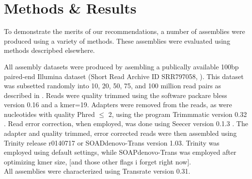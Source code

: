 \section*{Methods & Results}

To demonstrate the merits of our recommendations, a number of assemblies were produced using a variety of methods. These assemblies were evaluated using methods descripbed elsewhere. 

All assembly datasets were produced by asembling a publically available 100bp paired-end Illumina dataset (Short Read Archive ID SRR797058, \citep{Macfarlan:2012js}). This dataset was subsetted randomly into 10, 20, 50, 75, and 100 million read pairs as described in \citep{MacManes:2014io}. Reads were quality trimmed using the software packare bless version 0.16 \citep{Heo:2014cb} and a kmer=19.  Adapters were removed from the reads, as were nucleotides with quality Phred $\leq$ 2, using the program Trimmmatic version 0.32 \citep{Bolger:2014ek}. Read error correction, when employed, was done using Seecer version 0.1.3 \citep{Le:2013dy}. The adapter and quality trimmed, error corrected reads were then assembled using Trinity release r0140717 or SOADdenovo-Trans version 1.03. Trinity was employed using default settings, while SOAPdenovo-Trans was employed after optimizing kmer size, [and those other flags i forget right now]. \\

All assemblies were characterized using Transrate version 0.31. 